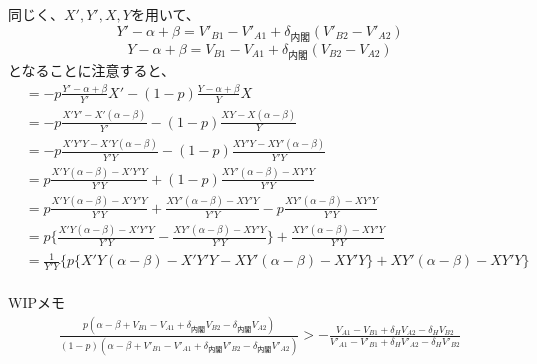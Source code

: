 \documentclass[main.tex]{subfiles}
\begin{document}
同じく、$X', Y', X, Y$を用いて、
$$Y' -\alpha + \beta = V'_{B1}-V'_{A1} + \delta_{内閣}(V'_{B2} - V'_{A2})$$
$$Y  -\alpha + \beta = V_{B1}-V_{A1} + \delta_{内閣}(V_{B2} - V_{A2})$$
となることに注意すると、
\begin{align*}
    &= -p \frac{ Y' -\alpha + \beta }{ Y' } X'  -    (1-p) \frac{ Y  -\alpha + \beta }{ Y }X\\[0.5em]
    &= -p \frac{ X'Y' - X'(\alpha - \beta) }{ Y'}   -    (1-p) \frac{ XY - X(\alpha - \beta) }{ Y }\\[0.5em]
    &= -p \frac{ X'Y'Y - X'Y(\alpha - \beta) }{ Y'Y}   -    (1-p) \frac{ XY'Y - XY'(\alpha - \beta) }{Y' Y }\\[0.5em]
    &= p \frac{ X'Y(\alpha - \beta) - X'Y'Y  }{ Y'Y}   +   (1-p) \frac{ XY'(\alpha - \beta) - XY'Y }{Y' Y }\\[0.5em]
    &= p \frac{ X'Y(\alpha - \beta) - X'Y'Y  }{ Y'Y}   +   \frac{ XY'(\alpha - \beta) - XY'Y }{Y' Y } - p \frac{ XY'(\alpha - \beta) - XY'Y }{Y' Y }\\[0.5em]
    &= p \Big\{ \frac{ X'Y(\alpha - \beta) - X'Y'Y  }{ Y'Y} - \frac{ XY'(\alpha - \beta) - XY'Y }{Y' Y } \Big\}   +   \frac{ XY'(\alpha - \beta) - XY'Y }{Y' Y } \\[0.5em]
    &= \frac{1}{Y'Y} \Big\{ p \{ X'Y(\alpha - \beta) - X'Y'Y  - XY'(\alpha - \beta) - XY'Y  \}   +   XY'(\alpha - \beta) - XY'Y  \Big\}\\[0.5em]
\end{align*}











\newpage
WIPメモ
\begin{align*}
    \frac{ p( \alpha-\beta + V_{B1}-V_{A1} + \delta_{内閣}V_{B2} - \delta_{内閣}V_{A2} ) }{ (1-p)( \alpha-\beta + V'_{B1}-V'_{A1} + \delta_{内閣}V'_{B2} - \delta_{内閣}V'_{A2} ) }    >    - \frac{ V_{A1} - V_{B1} + \delta_H V_{A2} - \delta_H V_{B2} }{ V'_{A1} -V'_{B1} + \delta_H V'_{A2} - \delta_H V'_{B2} } \\[1em]
\end{align*}
\end{document}
